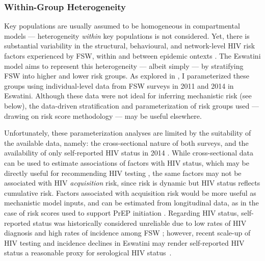 \subsubsection{Within-Group Heterogeneity}\label{model.disc.par.het}
Key populations are usually assumed to be homogeneous in compartmental models
--- \ie heterogeneity \emph{within} key populations is not considered.
Yet, there is substantial variability in
the structural, behavioural, and network-level HIV risk factors experienced by FSW,
within and between epidemic ontexts \cite{Blanchard2008,Scorgie2012,Shannon2015,Willcox2021}.
The Eswatini model aims to represent this heterogeneity --- albeit simply ---
by stratifying FSW into higher and lower risk groups.
As explored in , I parameterized these groups using individual-level data from
FSW surveys in 2011 \cite{Baral2014} and 2014 \cite{EswKP2014} in Eswatini.
Although these data were not ideal for inferring mechanistic risk (see below),
the data-driven stratification and parameterization of risk groups used
--- drawing on risk score methodology \cite{Ayton2020,Willcox2021} ---
may be useful elsewhere.
\par
Unfortunately, these parameterization analyses are limited by
the suitability of the available data, namely:
the cross-sectional nature of both surveys, and
the availability of only self-reported HIV status in 2014 \cite{Baral2014,EswKP2014}.
While cross-sectional data can be used to estimate associations of factors with HIV status,
which may be directly useful for recommending HIV testing \cite{Moucheraud2022},
the same factors may not be associated with HIV \emph{acquisition} risk,
since risk is dynamic but HIV status reflects cumulative risk.
Factors associated with acquisition risk would be more useful as mechanistic model inputs,
and can be estimated from longitudinal data,
as in the case of risk scores used to support PrEP initiation \cite{Ayton2020,Willcox2021}.
Regarding HIV status, self-reported status was historically considered unreliable due to
low rates of HIV diagnosis and high rates of incidence among FSW \cite{Mountain2014sr,Hakim2018};
however, recent scale-up of HIV testing and incidence declines in Eswatini
may render self-reported HIV status a reasonable proxy for serological HIV status~\cite{Xia2021}.
